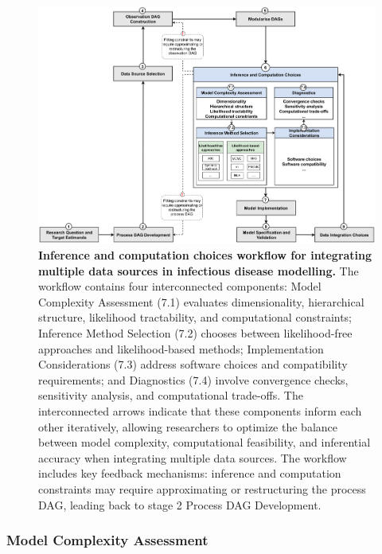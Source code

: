 \documentclass{article}
\begin{document}
\begin{figure}[htbp]
    \centering
    \includegraphics[width=\textwidth]{figures/restructured_fitting_workflow.drawio.pdf}
    \caption{\textbf{Inference and computation choices workflow for integrating multiple data sources in infectious disease modelling.} The workflow contains four interconnected components: Model Complexity Assessment (7.1) evaluates dimensionality, hierarchical structure, likelihood tractability, and computational constraints; Inference Method Selection (7.2) chooses between likelihood-free approaches and likelihood-based methods; Implementation Considerations (7.3) address software choices and compatibility requirements; and Diagnostics (7.4) involve convergence checks, sensitivity analysis, and computational trade-offs. The interconnected arrows indicate that these components inform each other iteratively, allowing researchers to optimize the balance between model complexity, computational feasibility, and inferential accuracy when integrating multiple data sources. The workflow includes key feedback mechanisms: inference and computation constraints may require approximating or restructuring the process DAG, leading back to stage 2 Process DAG Development. }
    \label{fig:fitting}
\end{figure}

\subsubsection{Model Complexity Assessment}
\end{document}
